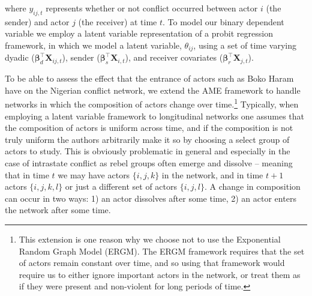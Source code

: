 where $y_{ij,t}$ represents whether or not conflict occurred between actor $i$ (the sender) and actor $j$ (the receiver) at time $t$. To model our binary dependent variable we employ a latent variable representation of a probit regression framework, in which we model a latent variable, $\theta_{ij}$, using a set of time varying dyadic ($\bm\beta_{d}^{\top} \mathbf{X}_{ij,t}$), sender ($\bm\beta_{s}^{\top} \mathbf{X}_{i,t}$), and receiver covariates ($\bm\beta_{r}^{\top} \mathbf{X}_{j,t}$).

To be able to assess the effect that the entrance of actors such as Boko Haram have on the Nigerian conflict network, we extend the AME framework to handle networks in which the composition of actors change over time.\footnote{This extension is one reason why we choose not to use the Exponential Random Graph Model (ERGM). The ERGM framework requires that the set of actors remain constant over time, and so using that framework would require us to either ignore important actors in the network, or treat them as if they were present and non-violent for long periods of time.} Typically, when employing a latent variable framework to longitudinal networks one assumes that the composition of actors is uniform across time, and if the composition is not truly uniform the authors arbitrarily make it so by choosing a select group of actors to study. This is obviously problematic in general and especially in the case of intrastate conflict as rebel groups often emerge and dissolve -- meaning that in time $t$ we may have actors $\{i,j,k\}$ in the network, and in time $t+1$ actors $\{i,j,k,l\}$ or just a different set of actors $\{i,j,l\}$. A change in composition can occur in two ways: 1) an actor dissolves after some time, 2) an actor enters the network after some time.

